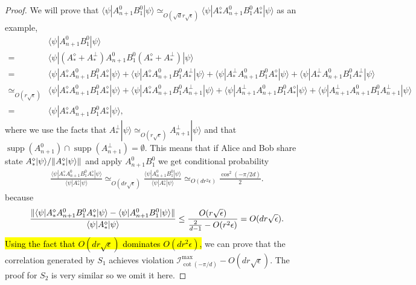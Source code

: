 \documentclass[11pt,letterpaper]{article}
\newcommand{\ket}[1]{|#1\rangle}
\newcommand{\bra}[1]{\langle#1|}
\DeclarePairedDelimiter{\norm}{\lVert}{\rVert}
\DeclareMathOperator{\supp}{supp}
\newcommand{\1}{\mathbb{1}}
\newcommand{\I}{\mathcal{I}}
\newcommand{\ep}{\epsilon}
\newcommand{\se}{\sqrt{\epsilon}}
\newcommand{\sd}{\sqrt{d}}
\newcommand{\appd}[1]{\simeq_{#1}}
\theoremstyle{definition}
\begin{document}
\begin{proof}
We will prove that $\bra{\psi} A_{n+1}^0B_1^0 \ket{\psi} \appd{O(\sd r\se)} \bra{\psi}A_\ast^\diamond A_{n+1}^0B_1^0 A_\ast^\diamond\ket{\psi}$ as an example,
\begin{align*}
	   &\bra{\psi} A_{n+1}^0B_1^0 \ket{\psi} \\
	= &\bra{\psi}(A_\ast^\diamond + A_\ast^\perp) A_{n+1}^0B_1^0 (A_\ast^\diamond + A_\ast^\perp)\ket{\psi} \\
	= & \bra{\psi}A_\ast^\diamond A_{n+1}^0B_1^0 A_\ast^\diamond\ket{\psi} + \bra{\psi}A_\ast^\diamond A_{n+1}^0B_1^0 A_\ast^\perp\ket{\psi}
	+\bra{\psi}A_\ast^\perp A_{n+1}^0B_1^0 A_\ast^\diamond\ket{\psi} + \bra{\psi}A_\ast^\perp A_{n+1}^0B_1^0 A_\ast^\perp\ket{\psi}\\
	\appd{O(r\se)} & \bra{\psi}A_\ast^\diamond A_{n+1}^0B_1^0 A_\ast^\diamond\ket{\psi} + \bra{\psi}A_\ast^\diamond A_{n+1}^0B_1^0 A_{n+1}^\perp\ket{\psi} 
	+\bra{\psi}A_{n+1}^\perp A_{n+1}^0B_1^0 A_\ast^\diamond\ket{\psi} + \bra{\psi}A_{n+1}^\perp A_{n+1}^0B_1^0 A_{n+1}^\perp\ket{\psi}\\
	=&\bra{\psi}A_\ast^\diamond A_{n+1}^0B_1^0 A_\ast^\diamond\ket{\psi},
\end{align*}
where we use the facts that $A_\ast^\perp \ket{\psi} \appd{O(r\se)} A_{n+1}^\perp \ket{\psi}$ and that 
$\supp(A_{n+1}^0) \cap \supp(A_{n+1}^\perp) = \emptyset$. This means that if Alice and Bob share state $A_\ast^\diamond \ket{\psi}/\norm{A_\ast^\diamond \ket{\psi}}$ and apply $A_{n+1}^0B_1^0$
we get conditional probability
\begin{align}
	\frac{\bra{\psi}A_\ast^\diamond A_{n+1}^0B_1^0 A_\ast^\diamond\ket{\psi}}{\bra{\psi} A_\ast^\diamond \ket{\psi}}  
	\appd{O(d r\se)} \frac{\bra{\psi} A_{n+1}^0B_1^0 \ket{\psi}}{\bra{\psi} A_\ast^\diamond \ket{\psi}}
	\appd{O(d r^2 \ep)}
	\frac{\cos^2(-\pi/2d)}{2}.
\end{align} 
because
\begin{align}
	\frac{ \norm{\bra{\psi}A_\ast^\diamond A_{n+1}^0B_1^0 A_\ast^\diamond\ket{\psi} -  \bra{\psi} A_{n+1}^0B_1^0 \ket{\psi}}}
	{\bra{\psi} A_\ast^\diamond \ket{\psi}} \leq \frac{O(r\se)}{\frac{2}{d-1} - O(r^2 \ep)} = O(d r  \se).
\end{align}
\hl{Using the fact that $O(d r \se)$ dominates $O(dr^2 \ep)$,}
we can prove that the correlation generated by $S_1$ achieves violation $\I^{\max}_{\cot(-\pi/d)} - O(d r \se)$.
The proof for $S_2$ is very similar so we omit it here.
\end{proof}
\end{document}
